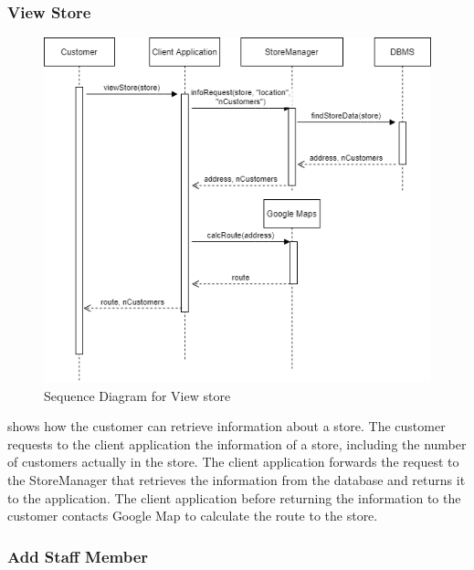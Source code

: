 \subsubsection{View Store} %
\begin{figure}[H]
    \centering
    \includegraphics[height=0.4\textwidth]{Images/CustomerSequenceDiagrams/ViewStoreSequenceDiagram.png}
    \caption{Sequence Diagram for View store}
    \label{fig:SDViewStore}
\end{figure}
 shows how the customer can retrieve information about a store.
The customer requests to the client application the information of a store, including the number of customers actually in the store.
The client application forwards the request to the StoreManager that retrieves the information from the database and returns it to the application.
The client application before returning the information to the customer contacts Google Map to calculate the route to the store.

\subsubsection{Add Staff Member}

